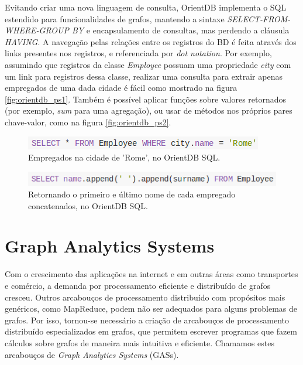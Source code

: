 \documentclass[conference]{IEEEtran}
\begin{document}
Evitando criar uma nova linguagem de consulta, OrientDB implementa o SQL estendido para funcionalidades de grafos, mantendo a sintaxe \emph{SELECT-FROM-WHERE-GROUP BY} e encapsulamento de consultas, mas perdendo a cláusula \emph{HAVING}. A navegação pelas relações entre os registros do BD é feita através dos links presentes nos registros, e referenciada por \emph{dot notation}. Por exemplo, assumindo que registros da classe \emph{Employee} possuam uma propriedade \emph{city} com um link para registros dessa classe, realizar uma consulta para extrair apenas empregados de uma dada cidade é fácil como mostrado na figura \ref{fig:orientdb_ps1}. Também é possível aplicar funções sobre valores retornados (por exemplo, \emph{sum} para uma agregação), ou usar de métodos nos próprios pares chave-valor, como na figura \ref{fig:orientdb_ps2}.

\begin{figure}[htbp]
\centerline{\includegraphics[width=0.9\linewidth]{img/orientdb/orientdb_ps1.png}}
\caption{Empregados na cidade de 'Rome', no OrientDB SQL.}\label{fig:orientdb_ps1}
\label{fig}
\end{figure}

\begin{figure}[htbp]
\centerline{\includegraphics[width=0.9\linewidth]{img/orientdb/orientdb_ps2.png}}
\caption{Retornando o primeiro e último nome de cada empregado concatenados, no OrientDB SQL.}\label{fig:orientdb_ps2}
\label{fig}
\end{figure}

\cite{nole-sartiani}
\cite{horton}
\cite{thingspan}

\section{Graph Analytics Systems}
Com o crescimento das aplicações na internet e em outras áreas como
transportes e comércio, a demanda por processamento eficiente e
distribuído de grafos cresceu. Outros arcabouços de processamento
distribuído com propósitos mais genéricos, como MapReduce, podem não ser
adequados para alguns problemas de grafos. Por isso, tornou-se
necessário a criação de arcabouços de processamento distribuído
especializados em grafos, que permitem escrever programas que fazem
cálculos sobre grafos de maneira mais intuitiva e eficiente. Chamamos
estes arcabouços de {\em Graph Analytics Systems} (GASs).
\end{document}
